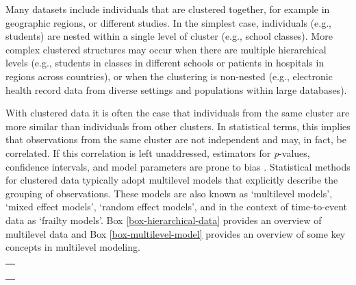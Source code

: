 \documentclass[
  article]{jss}
\newcounter{boxedmanual}
\newenvironment{boxedmanual}[1][]
{\begin{center}
\refstepcounter{boxedmanual}\par\medskip
\begin{tabular}{|p{0.99\textwidth}|}
\hline\\
{\centering\textbf{Box~\theboxedmanual: #1} \rmfamily{\medskip} \\}
}
{
\\\\\hline
\end{tabular}
\end{center}
}
\begin{document}
Many datasets include individuals that are clustered together, for
example in geographic regions, or different studies. In the simplest
case, individuals (e.g., students) are nested within a single level of
cluster (e.g., school classes). More complex clustered structures may
occur when there are multiple hierarchical levels (e.g., students in
classes in different schools or patients in hospitals in regions across
countries), or when the clustering is non-nested (e.g., electronic
health record data from diverse settings and populations within large
databases).

With clustered data it is often the case that individuals from the same
cluster are more similar than individuals from other clusters. In
statistical terms, this implies that observations from the same cluster
are not independent and may, in fact, be correlated. If this correlation
is left unaddressed, estimators for \emph{p}-values, confidence
intervals, and model parameters are prone to bias \citep{loca01}.
Statistical methods for clustered data typically adopt multilevel models
that explicitly describe the grouping of observations. These models are
also known as `multilevel models', `mixed effect models', `random effect
models', and in the context of time-to-event data as `frailty models'.
Box \ref{box-hierarchical-data} provides an overview of multilevel data
and Box \ref{box-multilevel-model} provides an overview of some key
concepts in multilevel modeling.

\begin{boxedmanual}[Multilevel data]
\label{box-hierarchical-data}

Data are grouped into clusters at different levels, observations belonging to the same cluster are expected to share certain characteristics. We can specify:

\begin{itemize}
    \setlength\itemsep{0.1em}
\item \textbf{Sample units:} units of the population from which measurements are taken in a sample, e.g., student or patient.
\item \textbf{Cluster:} variable that specify the cluster or grouping, e.g., classroom or hospital.
\item \textbf{Level-1 variable:} variable that varies within a cluster, e.g., test score.
\item \textbf{Level-2 variable:} variable that does not vary within a cluster but between clusters, e.g., teacher experience or geographical region of the hospital.
\end{itemize}

\end{boxedmanual}
\end{document}

